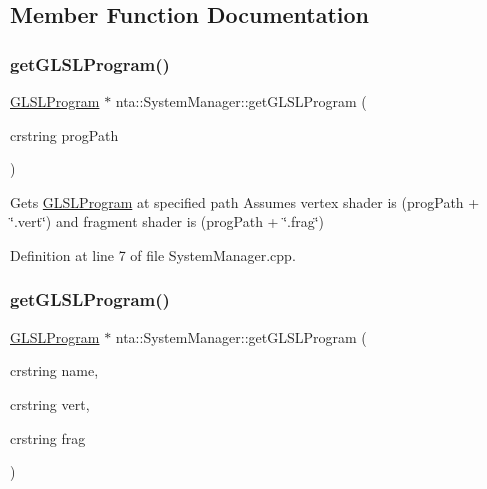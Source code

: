 \subsection{Member Function Documentation}
\mbox{\label{classnta_1_1SystemManager_af37be3ff4538da0a95b5ca257187077c}} 
\subsubsection{\texorpdfstring{get\+G\+L\+S\+L\+Program()}{getGLSLProgram()}\hspace{0.1cm}{\footnotesize\ttfamily [1/2]}}
{\footnotesize\ttfamily \hyperlink{classnta_1_1GLSLProgram}{G\+L\+S\+L\+Program} $\ast$ nta\+::\+System\+Manager\+::get\+G\+L\+S\+L\+Program (\begin{DoxyParamCaption}\item[{crstring}]{prog\+Path }\end{DoxyParamCaption})\hspace{0.3cm}{\ttfamily [static]}}

Gets \hyperlink{classnta_1_1GLSLProgram}{G\+L\+S\+L\+Program} at specified path Assumes vertex shader is (prog\+Path + \char`\"{}.\+vert\char`\"{}) and fragment shader is (prog\+Path + \char`\"{}.\+frag\char`\"{}) 

Definition at line 7 of file System\+Manager.\+cpp.

\mbox{\label{classnta_1_1SystemManager_a656e005054ec89f1370616aa499b8a1a}} 
\subsubsection{\texorpdfstring{get\+G\+L\+S\+L\+Program()}{getGLSLProgram()}\hspace{0.1cm}{\footnotesize\ttfamily [2/2]}}
{\footnotesize\ttfamily \hyperlink{classnta_1_1GLSLProgram}{G\+L\+S\+L\+Program} $\ast$ nta\+::\+System\+Manager\+::get\+G\+L\+S\+L\+Program (\begin{DoxyParamCaption}\item[{crstring}]{name,  }\item[{crstring}]{vert,  }\item[{crstring}]{frag }\end{DoxyParamCaption})\hspace{0.3cm}{\ttfamily [static]}}

